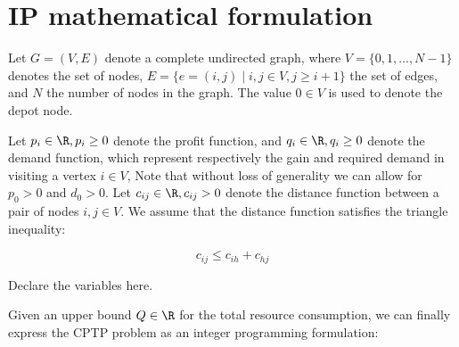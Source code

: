 \chapter{IP mathematical formulation}

Let $G = \left(V, E \right)$ denote a complete undirected graph, where $V = \lbrace 0, 1, \dots, N - 1 \rbrace$ denotes the set of nodes,
$E = \lbrace  e = (i, j) \mid i,j \in V, j \ge i + 1 \rbrace$ the set of edges, and $N$ the number of nodes in the graph.
The value $0 \in V$ is used to denote the depot node.

Let $p_{i} \in \R, p_{i} \ge 0$ denote the profit function, and $q_{i} \in \R, q_{i} \ge 0$ denote the demand function, which represent respectively the gain and required demand in visiting a vertex $i \in V$,
Note that without loss of generality we can allow for $p_{0} > 0$ and $d_{0} > 0$.
Let $c_{ij} \in \R, c_{ij} > 0$ denote the distance function between a pair of nodes  $i, j \in V$.
We assume that the distance function satisfies the triangle inequality:

\begin{equation}
	c_{ij} \le c_{ih} + c_{hj}
\end{equation}



Declare the variables here.

Given an upper bound $Q \in \R$ for the total resource consumption, we can finally express the CPTP problem as an integer programming formulation:


